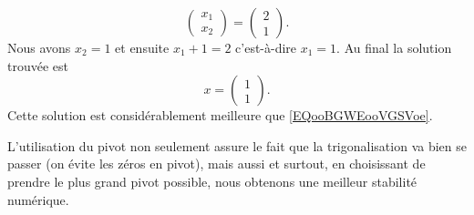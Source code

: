 \begin{example}
\begin{equation}
\begin{pmatrix}
			x_1 \\
			x_2
		\end{pmatrix}=\begin{pmatrix}
			2 \\
			1
		\end{pmatrix}.
	\end{equation}
	Nous avons \( x_2=1\) et ensuite \( x_1+1=2\) c'est-à-dire \( x_1=1\). Au final la solution trouvée est
	\begin{equation}
		x=\begin{pmatrix}
			1 \\
			1
		\end{pmatrix}.
	\end{equation}
	Cette solution est considérablement meilleure que \eqref{EQooBGWEooVGSVoe}.
\end{example}

\begin{normaltext}
	L'utilisation du pivot non seulement assure le fait que la trigonalisation va bien se passer (on évite les zéros en pivot), mais aussi et surtout, en choisissant de prendre le plus grand pivot possible, nous obtenons une meilleur stabilité numérique.
\end{normaltext}
